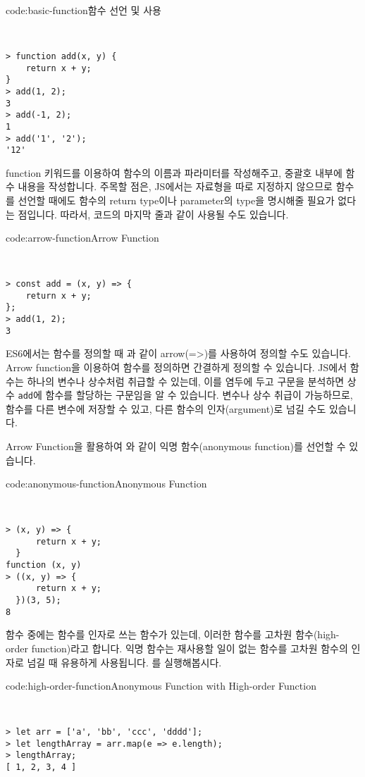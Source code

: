 \begin{codeenv}{code:basic-function}{함수 선언 및 사용}\begin{verbatim}


> function add(x, y) {
    return x + y;
}
> add(1, 2);
3
> add(-1, 2);
1
> add('1', '2');
'12'
\end{verbatim}
\end{codeenv}

function 키워드를 이용하여 함수의 이름과 파라미터를 작성해주고, 중괄호 내부에 함수 내용을 작성합니다. 주목할 점은, JS에서는 자료형을 따로 지정하지 않으므로 함수를 선언할 때에도 함수의 return type이나 parameter의 type을 명시해줄 필요가 없다는 점입니다. 따라서, 코드의 마지막 줄과 같이 사용될 수도 있습니다. 

\begin{codeenv}{code:arrow-function}{Arrow Function}\begin{verbatim}


> const add = (x, y) => {
    return x + y;
};
> add(1, 2);
3
\end{verbatim}
\end{codeenv}

ES6에서는 함수를 정의할 때 과 같이 arrow(=>)를 사용하여 정의할 수도 있습니다. Arrow function을 이용하여 함수를 정의하면 간결하게 정의할 수 있습니다. JS에서 함수는 하나의 변수나 상수처럼 취급할 수 있는데, 이를 염두에 두고 구문을 분석하면 상수 \verb|add|에 함수를 할당하는 구문임을 알 수 있습니다. 변수나 상수 취급이 가능하므로, 함수를 다른 변수에 저장할 수 있고, 다른 함수의 인자(argument)로 넘길 수도 있습니다. 

Arrow Function을 활용하여 와 같이 익명 함수(anonymous function)를 선언할 수 있습니다. 

\begin{codeenv}{code:anonymous-function}{Anonymous Function}\begin{verbatim}


> (x, y) => {
      return x + y;
  }
function (x, y)
> ((x, y) => {
      return x + y;
  })(3, 5);
8
\end{verbatim}
\end{codeenv}

함수 중에는 함수를 인자로 쓰는 함수가 있는데, 이러한 함수를 고차원 함수(high-order function)라고 합니다. 익명 함수는 재사용할 일이 없는 함수를 고차원 함수의 인자로 넘길 때 유용하게 사용됩니다. 를 실행해봅시다. 

\begin{codeenv}{code:high-order-function}{Anonymous Function with High-order Function}\begin{verbatim}


> let arr = ['a', 'bb', 'ccc', 'dddd'];
> let lengthArray = arr.map(e => e.length);
> lengthArray;
[ 1, 2, 3, 4 ]
\end{verbatim}
\end{codeenv}

